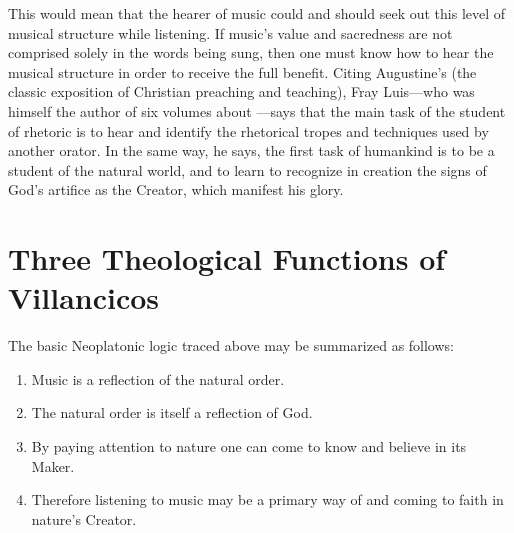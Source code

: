 This would mean that the hearer of music could and should seek out this level of musical structure while listening.
If music's value and sacredness are not comprised solely in the words being sung, then one must know how to hear the musical structure in order to receive the full benefit.
Citing Augustine's  (the classic exposition of Christian preaching and teaching), Fray Luis---who was himself the author of six volumes about ---says that the main task of the student of rhetoric is to hear and identify the rhetorical tropes and techniques used by another orator.
In the same way, he says, the first task of humankind is to be a student of the natural world, and to learn to recognize in creation the signs of God's artifice as the Creator, which manifest his glory.


\section{%
Three Theological Functions of Villancicos
}

The basic Neoplatonic logic traced above may be summarized as follows: 

\begin{enumerate}
\item Music is a reflection of the natural order.
\item The natural order is itself a reflection of God.
\item By paying attention to nature one can come to know and believe in its Maker.
\item Therefore listening to music may be a primary way of  and coming to faith in nature's Creator.
\end{enumerate}


